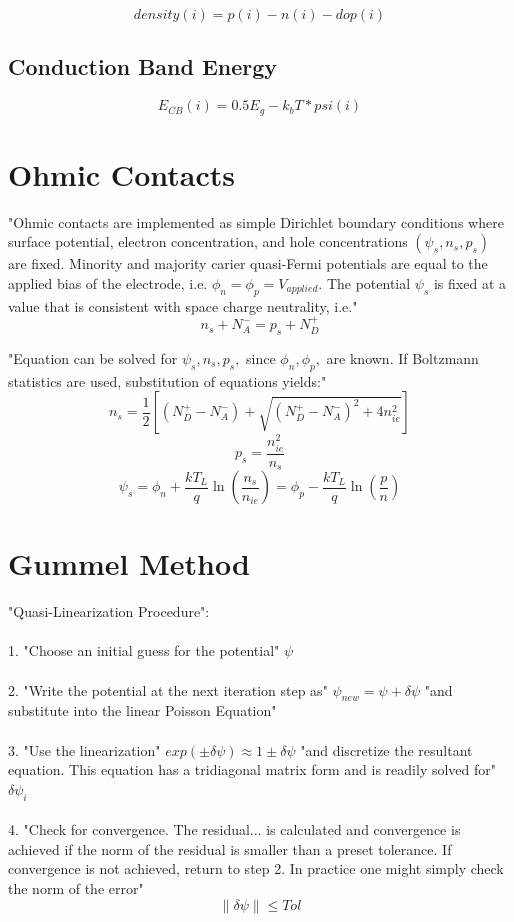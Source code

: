 \documentclass[12pt]{article}
\begin{document}
\[
density(i)=p(i)-n(i)-dop(i)
\]

\subsection{Conduction Band Energy}
\[
E_{CB}(i)=0.5E_{g}-k_{b}T*psi(i)
\]

\section{Ohmic Contacts \cite[p. 3-23]{Software1998}}
"Ohmic contacts are implemented as simple Dirichlet boundary conditions where surface potential, electron concentration, and hole concentrations $(\psi_{s},n_{s},p_{s})$ are fixed. Minority and majority carier quasi-Fermi potentials are equal to the applied bias of the electrode, i.e. $ \phi_{n}=\phi_{p}=V_{applied}$. The potential $\psi_{s}$ is fixed at a value that is consistent with space charge neutrality, i.e."
\begin{equation}
	n_{s}+N_{A}^{-}=p_{s}+N_{D}^{+}
\end{equation}

"Equation can be solved for $\psi_{s},n_{s},p_{s},$ since $ \phi_{n},\phi_{p},$ are known. If Boltzmann statistics are used, substitution of equations yields:"
\begin{equation}
n_{s}=\frac{1}{2}[(N_{D}^{+}-N_{A}^{-})+\sqrt{(N_{D}^{+}-N_{A}^{-})^{2}+4n_{ie}^{2}}]
\end{equation}
\begin{equation}
p_{s}=\frac{n_{ie}^{2}}{n_{s}}
\end{equation}
\begin{equation}
\psi_{s}=\phi_{n}+\frac{kT_{L}}{q}\ln(\frac{n_{s}}{n_{ie}})=\phi_{p}-\frac{kT_{L}}{q}\ln(\frac{p}{n})
\end{equation}


\section{Gummel Method \cite[p. 40]{Vasileska2006}}
"Quasi-Linearization Procedure": \\
\\
1. "Choose an initial guess for the potential" $ \psi $
\\
\\
2. "Write the potential at the next iteration step as" $ \psi_{new} = \psi + \delta \psi $ "and substitute into the linear Poisson Equation"
\\
\\
3. "Use the linearization" $ exp(\pm \delta \psi) \approx 1 \pm \delta \psi $ "and discretize the resultant equation. This equation has a tridiagonal matrix form and is readily solved for" $ \delta \psi_{i} $
\\
\\
4. "Check for convergence. The residual... is calculated and convergence is achieved if the norm of the residual is smaller than a preset tolerance. If convergence is not achieved, return to step 2. In practice one might simply check the norm of the error"
\[\| \delta \psi \| \leq Tol \]
\end{document}

